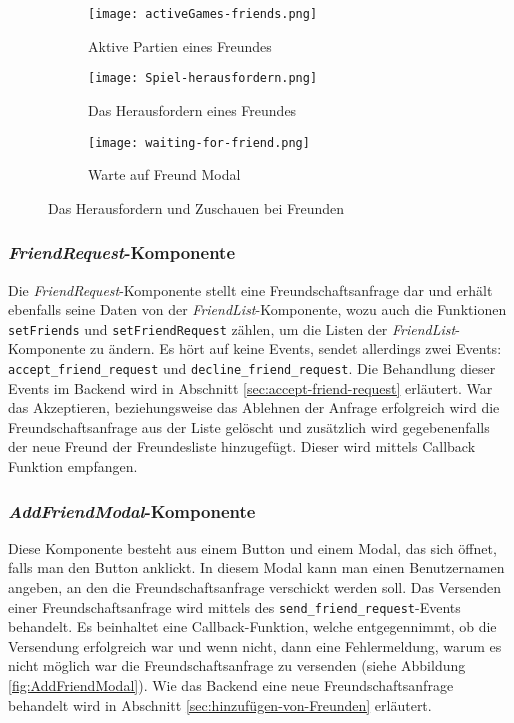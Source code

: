 \begin{figure}[h]
\centering
  \begin{subfigure}[c]{0.35\textwidth}
  \centering
  \texttt{[image: activeGames-friends.png]}
  \caption{Aktive Partien eines Freundes}
  \label{fig:activeGames-friends}
  \end{subfigure}
  \hfill
  \begin{subfigure}[c]{0.3\textwidth}
  \centering
    \texttt{[image: Spiel-herausfordern.png]}
  \caption{Das Herausfordern eines Freundes}
  \label{fig:spiel-herausfordern}
  \end{subfigure}
  \hfill
 \begin{subfigure}[c]{0.3\textwidth}
  \centering
    \texttt{[image: waiting-for-friend.png]}
  \caption{Warte auf Freund Modal}
  \label{fig:waiting-for-friend}
  \end{subfigure}
  \caption{Das Herausfordern und Zuschauen bei Freunden}
  \label{fig:Freunde-zuschauen-herausfordern}
 
\end{figure}


\subsubsection{\textit{FriendRequest}-Komponente}
Die \textit{FriendRequest}-Komponente stellt eine Freundschaftsanfrage dar und erhält ebenfalls seine Daten von der \textit{FriendList}-Komponente, wozu auch die Funktionen \verb|setFriends| und \verb|setFriendRequest| zählen, um die Listen der \textit{FriendList}-Komponente zu ändern.
Es hört auf keine Events, sendet allerdings zwei Events: \verb|accept_friend_request| und \verb|decline_friend_request|. Die Behandlung dieser Events im Backend wird in Abschnitt \ref{sec:accept-friend-request} erläutert. War das Akzeptieren, beziehungsweise das Ablehnen der Anfrage erfolgreich wird die Freundschaftsanfrage aus der Liste gelöscht und zusätzlich wird gegebenenfalls der neue Freund der Freundesliste hinzugefügt. Dieser wird mittels Callback Funktion empfangen.

\subsubsection{\textit{AddFriendModal}-Komponente}
Diese Komponente besteht aus einem Button und einem Modal, das sich öffnet, falls man den Button anklickt. In diesem Modal kann man einen Benutzernamen angeben, an den die Freundschaftsanfrage verschickt werden soll. Das Versenden einer Freundschaftsanfrage wird mittels des \verb|send_friend_request|-Events behandelt. Es beinhaltet eine Callback-Funktion, welche entgegennimmt, ob die Versendung erfolgreich war und wenn nicht, dann eine Fehlermeldung, warum es nicht möglich war die Freundschaftsanfrage zu versenden (siehe Abbildung \ref{fig:AddFriendModal}). Wie das Backend eine neue Freundschaftsanfrage behandelt wird in Abschnitt \ref{sec:hinzufügen-von-Freunden} erläutert.

